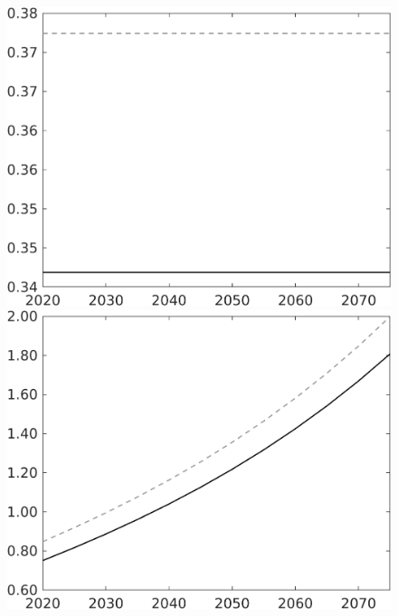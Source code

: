 \begin{figure}[h!!]
\begin{minipage}[]{0.32\textwidth}
\end{minipage}	
\begin{minipage}[]{0.32\textwidth}
\includegraphics[width=1\textwidth]{../../codding_model/own_basedOnFried/optimalPol_010922_revision/figures/all_13Sept22/CompTaul_Equlab_LFBAU_Reg0_hh_spillover0_nsk1_xgr1_knspil0_sep1_countec0_GovRev1_etaa0.79_lgd0.png}
\end{minipage}	
\begin{minipage}[]{0.32\textwidth}
\includegraphics[width=1\textwidth]{../../codding_model/own_basedOnFried/optimalPol_010922_revision/figures/all_13Sept22/CompTaul_Equlab_LFBAU_Reg0_C_spillover0_nsk1_xgr1_knspil0_sep1_countec0_GovRev1_etaa0.79_lgd0.png}

\end{minipage}
\end{figure}
